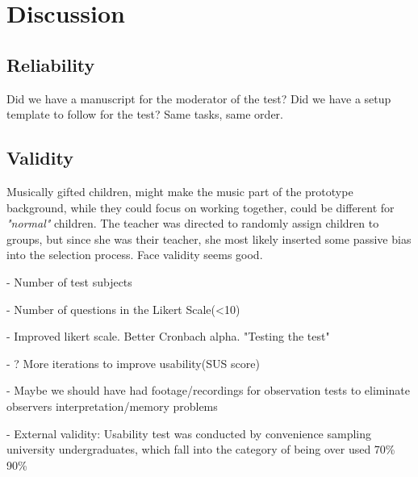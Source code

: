 \chapter{Discussion}
    \section{Reliability}
        
        Did we have a manuscript for the moderator of the test?
        Did we have a setup template to follow for the test?
        Same tasks, same order.
        
    \section{Validity}
        Musically gifted children, might make the music part of the prototype background, while they could focus on working together, could be different for \textit{"normal"} children.
        The teacher was directed to randomly assign children to groups, but since she was their teacher, she most likely inserted some passive bias into the selection process.
        Face validity seems good.
        
        
        
        
        
- Number of test subjects
            
- Number of questions in the Likert Scale(<10)

- Improved likert scale. Better Cronbach alpha. "Testing the test"
        
- ? More iterations to improve usability(SUS score)

- Maybe we should have had footage/recordings for observation tests to eliminate observers interpretation/memory problems

- External validity: Usability test was conducted by convenience sampling university undergraduates, which fall into the category of being over used 70\% 90\%